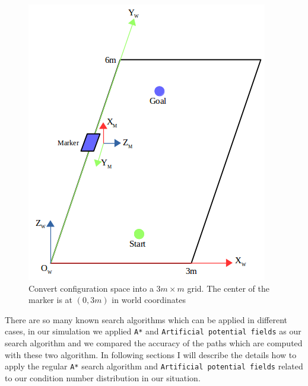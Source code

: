 \begin{figure}[h]
\centering
\includegraphics[scale=0.6]{./fig/grid_world_marker.png}
\caption{Convert configuration space into a $3m \times m$ grid. The center of the marker is at $(0,3m)$ in world coordinates}
\label{fig:grid_world_marker}
\end{figure}

There are so many known search algorithms which can be applied in different cases, in our simulation we applied \texttt{A*} and \texttt{Artificial potential fields} as our search algorithm and we compared the accuracy of the paths which are computed with these two algorithm. In following sections I will describe the details how to apply the regular \texttt{A*} search algorithm and \texttt{Artificial potential fields} related to our condition number distribution in our situation.

